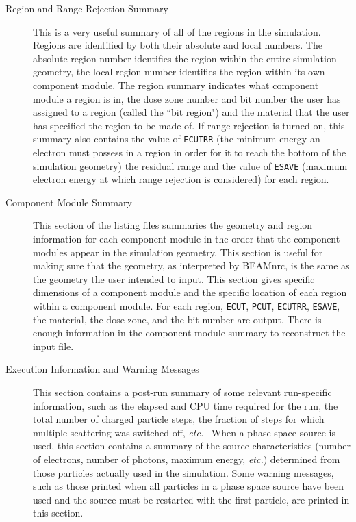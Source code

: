 \documentclass[12pt,twoside]{article}
\newcommand{\etc}{{\em etc.}}
\begin{document}
\begin{description}
\begin{description}
\item [Region and Range Rejection Summary]
This is a very useful summary of all of the regions in the simulation.  Regions are identified by both their absolute and local numbers.  The absolute
region number identifies the region within the entire simulation
geometry, the local region number identifies the region within its own
component module.  The region summary indicates what component module a
region is in, the dose zone number and bit number
the user has assigned to a region (called the ``bit region")
and the material that the user has
specified the region to be made of.  If range rejection is turned on,
this summary also contains the value of \verb+ECUTRR+ (the minimum energy an
electron must possess in a region in order for it
to reach the bottom of the simulation geometry) the residual
range and the value of \verb+ESAVE+ (maximum electron energy at which range
rejection is considered) for each region.

\item [Component Module Summary]
This section of the listing files summaries the geometry and region
information for each component module in the order that the component
modules appear in the simulation geometry.  This section is useful for
making sure that the geometry, as interpreted by BEAMnrc, is the same as the
geometry the user intended to input.  This section gives specific
dimensions of a component module and the specific location of each
region within a component module.  For each region, \verb+ECUT+,
\verb+PCUT+, \verb+ECUTRR+, \verb+ESAVE+, the material,
the dose zone, and the bit number are
output.  There is enough information in the component module
summary to reconstruct the input file.

\item [Execution Information and Warning Messages]
This section contains a post-run summary of some relevant run-specific
information, such as the elapsed and CPU time required for the run, the
total number of charged particle steps, the fraction of steps for which
multiple scattering was switched off, \etc~  When a phase space source is
used,  this section contains a summary of the source
characteristics (number of electrons, number of photons, maximum energy,
\etc) determined from those particles actually used in the simulation.
Some warning messages, such as those printed when all particles in a
phase space source have been used and the source must be restarted with the
first particle, are printed in this section.


\end{description}
\end{description}
\end{document}
